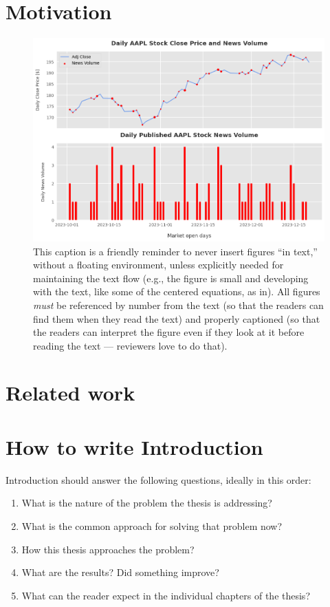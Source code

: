 \section*{Motivation}
\begin{figure}[htbp]
\centering
\includegraphics[width=1\linewidth]{img/motivation-sample.png}
\caption{This caption is a friendly reminder to never insert figures ``in text,'' without a floating environment, unless explicitly needed for maintaining the text flow (e.g., the figure is small and developing with the text, like some of the centered equations, as in). All figures \emph{must} be referenced by number from the text (so that the readers can find them when they read the text) and properly captioned (so that the readers can interpret the figure even if they look at it before reading the text --- reviewers love to do that).}
\label{fig:f}
\end{figure}

\section*{Related work}

\section*{How to write Introduction}
Introduction should answer the following questions, ideally in this order:
\begin{enumerate}
\item What is the nature of the problem the thesis is addressing?
\item What is the common approach for solving that problem now?
\item How this thesis approaches the problem?
\item What are the results? Did something improve?
\item What can the reader expect in the individual chapters of the thesis?
\end{enumerate}

